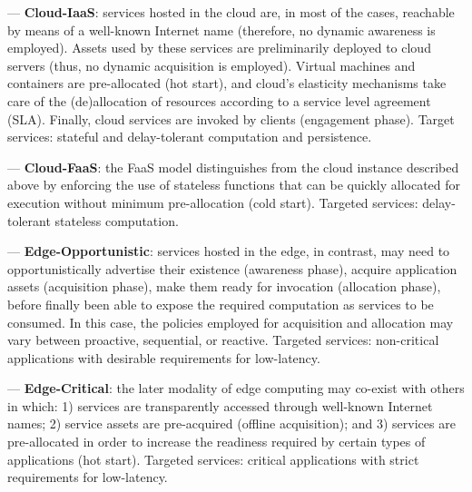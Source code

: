 --- \textbf{Cloud-IaaS}: services hosted in the cloud are, in most of the cases, reachable by means of a well-known Internet name (therefore, no dynamic awareness is employed). Assets used by these services are preliminarily deployed to cloud servers (thus, no dynamic acquisition is employed). Virtual machines and containers are pre-allocated (hot start), and cloud's elasticity mechanisms take care of the (de)allocation of resources according to a service level agreement (SLA). Finally, cloud services are invoked by clients (engagement phase). Target services: stateful and delay-tolerant computation and persistence.

--- \textbf{Cloud-FaaS}: the FaaS model distinguishes from the cloud instance described above by enforcing the use of stateless functions that can be quickly allocated for execution without minimum pre-allocation (cold start). Targeted services: delay-tolerant stateless computation.

--- \textbf{Edge-Opportunistic}: services hosted in the edge, in contrast, may need to opportunistically advertise their existence (awareness phase), acquire application assets (acquisition phase), make them ready for invocation (allocation phase), before finally been able to expose the required computation as services to be consumed. In this case, the policies employed for acquisition and allocation may vary between proactive, sequential, or reactive. Targeted services: non-critical applications with desirable requirements for low-latency.

--- \textbf{Edge-Critical}: the later modality of edge computing may co-exist with others in which: 1) services are transparently accessed through well-known Internet names; 2) service assets are pre-acquired (offline acquisition); and 3) services are pre-allocated in order to increase the readiness required by certain types of applications (hot start). Targeted services: critical applications with strict requirements for low-latency.



